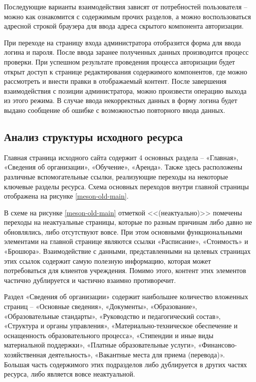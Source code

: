 Последующие варианты взаимодействия зависят от потребностей пользователя -- можно как ознакомится с содержимым прочих разделов, а можно воспользоваться адресной строкой браузера для ввода адреса скрытого компонента авторизации.

При переходе на страницу входа администратора отобразится форма для ввода логина и пароля.
После ввода заранее полученных данных производится процесс проверки.
При успешном результате проведения процесса авторизации будет открыт доступ к странице редактирования содержимого компонентов, где можно рассмотреть и внести правки в отображаемый контент.
После завершения взаимодействия с позиции администратора, можно произвести операцию выхода из этого режима.
В случае ввода некорректных данных в форму логина будет выдано сообщение об ошибке с возможностью повторного ввода данных.


\subsection{Анализ структуры исходного ресурса}\label{Анализ структуры исходного ресурса}

Главная страница исходного сайта содержит 4 основных раздела -- «Главная», «Сведения об организации», «Обучение», «Аренда».
Также здесь расположены различные вспомогательные ссылки, реализующие переходы на некоторые ключевые разделы ресурса.
Схема основных переходов внутри главной страницы отображена на рисунке \ref{meson-old-main}.


В схеме на рисунке \ref{meson-old-main} отметкой <<(неактуально)>> помечены переходы на неактуальные страницы, которые по разным причинам либо давно не обновлялись, либо отсутствуют вовсе.
При этом основными функциональными элементами на главной странице являются ссылки «Расписание», «Стоимость» и «Брошюра».
Взаимодействие с данными, представленными на целевых страницах этих ссылок содержит самую полезную информацию, которая может потребоваться для клиентов учреждения.
Помимо этого, контент этих элементов частично дублируется и частично взаимно противоречит.

Раздел «Сведения об организации» содержит наибольшее количество вложенных страниц -- «Основные сведения», «Документы», «Образование», «Образовательные стандарты», «Руководство и педагогический состав», «Структура и органы управления», «Материально-техническое обеспечение и оснащенность образовательного процесса», «Стипендии и иные виды материальной поддержки», «Платные образовательные услуги», «Финансово-хозяйственная деятельность», «Вакантные места для приема (перевода)».
Большая часть содержимого этих подразделов либо дублируется в других частях ресурса, либо является вовсе неактуальной.

